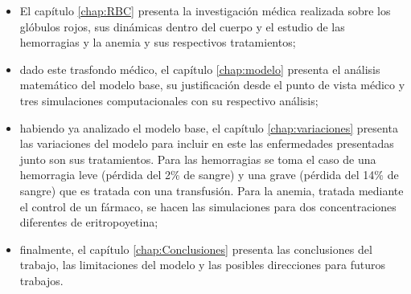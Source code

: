 \begin{itemize}
    \item El capítulo \ref{chap:RBC} presenta la investigación médica realizada sobre los glóbulos rojos, sus dinámicas dentro del cuerpo y el estudio de las hemorragias y la anemia y sus respectivos tratamientos;
    \item dado este trasfondo médico, el capítulo \ref{chap:modelo} presenta el análisis matemático del modelo base, su justificación desde el punto de vista médico y tres simulaciones computacionales con su respectivo análisis;
    \item habiendo ya analizado el modelo base, el capítulo \ref{chap:variaciones} presenta las variaciones del modelo para incluir en este las enfermedades presentadas junto son sus tratamientos. Para las hemorragias se toma el caso de una hemorragia leve (pérdida del 2$\%$ de sangre) y una grave (pérdida del 14$\%$ de sangre) que es tratada con una transfusión. Para la anemia, tratada mediante el control de un fármaco, se hacen las simulaciones para dos concentraciones diferentes de eritropoyetina;
    \item finalmente, el capítulo \ref{chap:Conclusiones} presenta las conclusiones del trabajo, las limitaciones del modelo y las posibles direcciones para futuros trabajos.
\end{itemize}